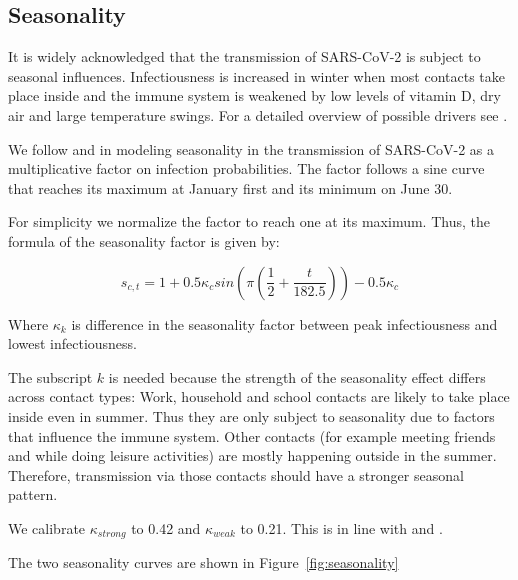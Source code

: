 \subsection{Seasonality}
\label{subsec:seasonality}

It is widely acknowledged that the transmission of SARS-CoV-2 is subject to seasonal
influences. Infectiousness is increased in winter when most contacts take place inside
and the immune system is weakened by low levels of vitamin D, dry air and large
temperature swings. For a detailed overview of possible drivers see
\cite{KronfeldSchor2021}.

We follow \cite{Kuehn2020} and \cite{Gavenciak2021} in modeling seasonality in the
transmission of SARS-CoV-2 as a multiplicative factor on infection probabilities. The
factor follows a sine curve that reaches its maximum at January first and its minimum
on June 30.

For simplicity we normalize the factor to reach one at its maximum. Thus, the formula of
the seasonality factor is given by:

\begin{equation}
\label{eq:seasonality}
    s_{c, t} = 1 + 0.5 \kappa_c  sin \left ( \pi  \left (\frac{1}{2} + \frac{t}{182.5}\right ) \right ) - 0.5 \kappa_c
\end{equation}

Where $\kappa_k$ is difference in the seasonality factor between peak infectiousness
and lowest infectiousness.

The subscript $k$ is needed because the strength of the seasonality effect differs
across contact types: Work, household and school contacts are likely to take place
inside even in summer. Thus they are only subject to seasonality due to factors that
influence the immune system. Other contacts (for example meeting friends and while doing
leisure activities) are mostly happening outside in the summer. Therefore, transmission
via those contacts should have a stronger seasonal pattern.

We calibrate $\kappa_{strong}$ to 0.42 and $\kappa_{weak}$ to 0.21. This is in line with
\cite{Gavenciak2021} and \cite{Kuehn2020}.

The two seasonality curves are shown in Figure~\ref{fig:seasonality}

